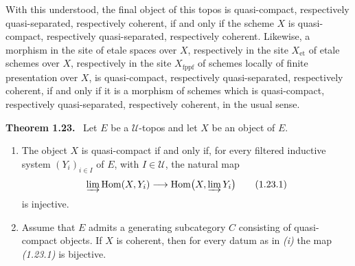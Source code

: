 \documentclass[11pt]{article}
\newcommand{\U}{\mathcal{U}}
\newcommand{\Hom}{\operatorname{Hom}}
\newenvironment{statement}[1]{\par\medskip\noindent\textbf{#1.}\ }{\par\medskip}
\begin{document}
With this understood, the final object of this topos is quasi-compact, respectively quasi-separated, respectively coherent, if and only if the scheme \(X\) is quasi-compact, respectively quasi-separated, respectively coherent. Likewise, a morphism in the site of etale spaces over \(X\), respectively in the site \(X_{\mathrm{et}}\) of etale schemes over \(X\), respectively in the site \(X_{\mathrm{fppf}}\) of schemes locally of finite presentation over \(X\), is quasi-compact, respectively quasi-separated, respectively coherent, if and only if it is a morphism of schemes which is quasi-compact, respectively quasi-separated, respectively coherent, in the usual sense.

\begin{statement}{Theorem 1.23}
Let \(E\) be a \(\U\)-topos and let \(X\) be an object of \(E\).
\begin{enumerate}[label=(\roman*)]
\item The object \(X\) is quasi-compact if and only if, for every filtered inductive system \((Y_i)_{i\in I}\) of \(E\), with \(I\in\U\), the natural map
\[
\varinjlim \Hom(X,Y_i)\longrightarrow \Hom\bigl(X,\varinjlim Y_i\bigr)
\tag{1.23.1}
\]
is injective.
\item Assume that \(E\) admits a generating subcategory \(C\) consisting of quasi-compact objects. If \(X\) is coherent, then for every datum as in \emph{(i)} the map \emph{(1.23.1)} is bijective.
\end{enumerate}
\end{statement}
\end{document}
